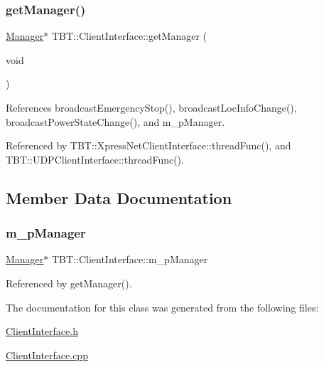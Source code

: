 \subsubsection{\texorpdfstring{get\+Manager()}{getManager()}}
{\footnotesize\ttfamily \hyperlink{classTBT_1_1Manager}{Manager}$\ast$ T\+B\+T\+::\+Client\+Interface\+::get\+Manager (\begin{DoxyParamCaption}\item[{void}]{ }\end{DoxyParamCaption})\hspace{0.3cm}{\ttfamily [inline]}}



References broadcast\+Emergency\+Stop(), broadcast\+Loc\+Info\+Change(), broadcast\+Power\+State\+Change(), and m\+\_\+p\+Manager.



Referenced by T\+B\+T\+::\+Xpress\+Net\+Client\+Interface\+::thread\+Func(), and T\+B\+T\+::\+U\+D\+P\+Client\+Interface\+::thread\+Func().



\subsection{Member Data Documentation}
\mbox{\label{classTBT_1_1ClientInterface_a1d6558ab5cd2ebcc135e5fc37a1844ba_a1d6558ab5cd2ebcc135e5fc37a1844ba}} 
\subsubsection{\texorpdfstring{m\+\_\+p\+Manager}{m\_pManager}}
{\footnotesize\ttfamily \hyperlink{classTBT_1_1Manager}{Manager}$\ast$ T\+B\+T\+::\+Client\+Interface\+::m\+\_\+p\+Manager\hspace{0.3cm}{\ttfamily [protected]}}



Referenced by get\+Manager().



The documentation for this class was generated from the following files\+:\begin{DoxyCompactItemize}
\item 
\hyperlink{ClientInterface_8h}{Client\+Interface.\+h}\item 
\hyperlink{ClientInterface_8cpp}{Client\+Interface.\+cpp}\end{DoxyCompactItemize}
